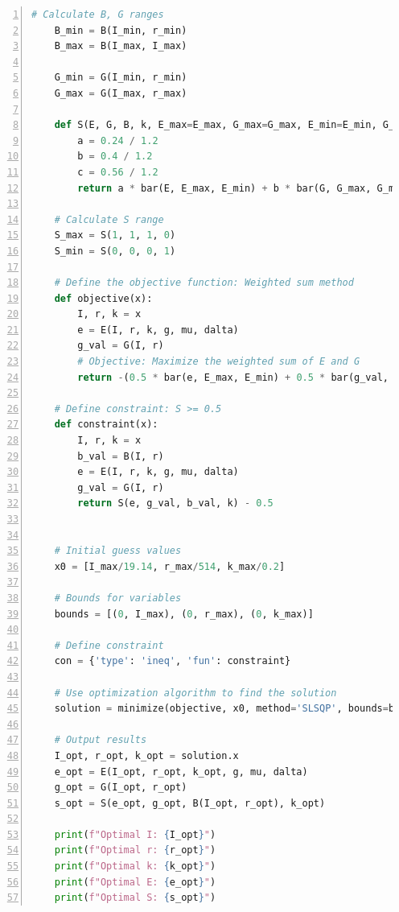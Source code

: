 \documentclass[UTF8]{mcmthesis}
\begin{document}
\begin{appendices}
\begin{lstlisting}[language = python, numbers = left]
    # Calculate B, G ranges
    B_min = B(I_min, r_min)
    B_max = B(I_max, I_max)
    
    G_min = G(I_min, r_min)
    G_max = G(I_max, r_max)
    
    def S(E, G, B, k, E_max=E_max, G_max=G_max, E_min=E_min, G_min=G_min):
        a = 0.24 / 1.2
        b = 0.4 / 1.2
        c = 0.56 / 1.2
        return a * bar(E, E_max, E_min) + b * bar(G, G_max, G_min) + c * (1 - k) * B
    
    # Calculate S range
    S_max = S(1, 1, 1, 0)
    S_min = S(0, 0, 0, 1)
    
    # Define the objective function: Weighted sum method
    def objective(x):
        I, r, k = x
        e = E(I, r, k, g, mu, dalta)
        g_val = G(I, r)
        # Objective: Maximize the weighted sum of E and G
        return -(0.5 * bar(e, E_max, E_min) + 0.5 * bar(g_val, G_max, G_min))  # Negative sign indicates maximization
        
    # Define constraint: S >= 0.5
    def constraint(x):
        I, r, k = x
        b_val = B(I, r)
        e = E(I, r, k, g, mu, dalta)
        g_val = G(I, r)
        return S(e, g_val, b_val, k) - 0.5
    
    
    # Initial guess values
    x0 = [I_max/19.14, r_max/514, k_max/0.2]
    
    # Bounds for variables
    bounds = [(0, I_max), (0, r_max), (0, k_max)]
    
    # Define constraint
    con = {'type': 'ineq', 'fun': constraint}
    
    # Use optimization algorithm to find the solution
    solution = minimize(objective, x0, method='SLSQP', bounds=bounds, constraints=con)
    
    # Output results
    I_opt, r_opt, k_opt = solution.x
    e_opt = E(I_opt, r_opt, k_opt, g, mu, dalta)
    g_opt = G(I_opt, r_opt)
    s_opt = S(e_opt, g_opt, B(I_opt, r_opt), k_opt)
    
    print(f"Optimal I: {I_opt}")
    print(f"Optimal r: {r_opt}")
    print(f"Optimal k: {k_opt}")
    print(f"Optimal E: {e_opt}")
    print(f"Optimal S: {s_opt}")
        \end{lstlisting}

    \end{appendices}
\end{document}
